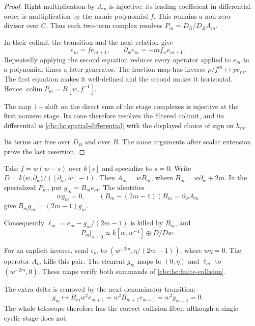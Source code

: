 \begin{proof}
Right multiplication by $A_m$ is injective: its leading
coefficient in differential order is multiplication by
the monic polynomial $f$. This remains a non-zero-divisor
over $C$. Thus each two-term complex resolves
$P_m=D_B/D_BA_m$.

In their colimit the transition and the next relation give
\[
 e_m=fe_{m+1},\qquad
 \partial_we_m=-mf_we_{m+1}.
\]
Repeatedly applying the second equation reduces every
operator applied to $e_m$ to a polynomial times a later
generator. The fraction map has inverse $p/f^m\mapsto pe_m$.
The first equation makes it well-defined and the second
makes it horizontal. Hence $\operatorname*{colim}P_m=B[w,f^{-1}]$.

The map $1-\mathrm{shift}$ on the direct sum of the stage
complexes is injective at the first nonzero stage. Its cone
therefore resolves the filtered colimit, and its differential
is \eqref{cbc:hc:spatial-differential} with the displayed
choice of sign on $h_m$.

Its terms are free over $D_B$
and over $B$. The same arguments after scalar extension
prove the last assertion.
\end{proof}

\begin{example}\label{cbc:hc:spurious-delta}
Take $f=w(w-s)$ over $k[s]$ and specialize to $s=0$.
Write $D=k\langle w,\partial_w\rangle/([\partial_w,w]-1)$.
Then $A_m=wB_m$, where $B_m=w\partial_w+2m$.
In the specialized $P_m$, put $g_m=B_me_m$.
The identities
\[
 wg_m=0,\qquad
 (B_m-(2m-1))B_m=\partial_w A_m
\]
give $B_mg_m=(2m-1)g_m$.

Consequently $\ell_m=e_m-g_m/(2m-1)$ is killed by $B_m$,
and
\begin{equation}\label{cbc:hc:finite-collision}
 P_m|_{s=0}\simeq k[w,w^{-1}]\oplus D/Dw.
\end{equation}

For an explicit inverse, send $e_m$ to
$(w^{-2m},\eta/(2m-1))$, where $w\eta=0$.
The operator $A_m$ kills this pair. The element $g_m$ maps to $(0,\eta)$
and $\ell_m$ to $(w^{-2m},0)$. These maps verify both
summands of \eqref{cbc:hc:finite-collision}.

The extra delta is removed by the next denominator transition:
\[
 g_m\longmapsto B_mw^2e_{m+1}
 =w^2B_{m+1}e_{m+1}=w^2g_{m+1}=0.
\]
The whole telescope therefore has the correct collision
fiber, although a single cyclic stage does not.
\end{example}


